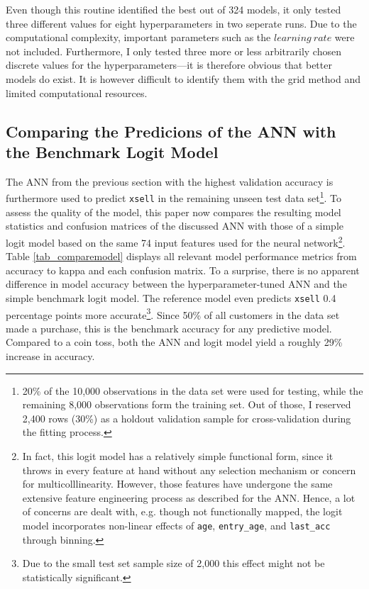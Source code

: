 \documentclass[12pt,a4paper]{article}
\let\code=\texttt
\begin{document}
Even though this routine identified the best out of 324 models, it only tested three different values for eight hyperparameters in two seperate runs.
Due to the computational complexity, important parameters such as the $learning\ rate$ were not included.
Furthermore, I only tested three more or less arbitrarily chosen discrete values for the hyperparameters---it is therefore obvious that
better models do exist. It is however difficult to identify them with the grid method and limited computational resources.

\subsection{Comparing the Predicions of the ANN with the Benchmark Logit Model}

The ANN from the previous section with the highest validation accuracy is furthermore used to predict \code{xsell} in the remaining unseen test data set\footnote{20\% 
of the 10,000 observations in the data set were used for testing, while the remaining 8,000 observations form the training set. Out of those, I reserved
2,400 rows (30\%) as a holdout validation sample for cross-validation during the fitting process.}.
To assess the quality of the model, this paper now compares the resulting model statistics and confusion matrices of the discussed ANN with those of a 
simple logit model based on the same 74 input features used for the neural network\footnote{In fact, this logit model has a relatively simple functional form, 
since it throws in every feature at hand without any selection mechanism or concern for multicolllinearity.
However, those features have undergone the same extensive feature engineering process as described for the ANN.
Hence, a lot of concerns are dealt with, e.g. though not functionally mapped, the logit model incorporates non-linear effects of \code{age}, \code{entry\_age}, and \code{last\_acc} through binning.}.
Table \ref{tab_comparemodel} displays all relevant model performance metrics from accuracy to kappa and each confusion matrix.
To a surprise, there is no apparent difference in model accuracy between the hyperparameter-tuned ANN and the simple benchmark logit model.
The reference model even predicts \code{xsell} 0.4 percentage points more accurate\footnote{Due to the small test set sample size of 2,000 this 
effect might not be statistically significant.}.
Since 50\% of all customers in the data set made a purchase, this is the benchmark accuracy for any predictive model.
Compared to a coin toss, both the ANN and logit model yield a roughly 29\% increase in accuracy.
\end{document}
